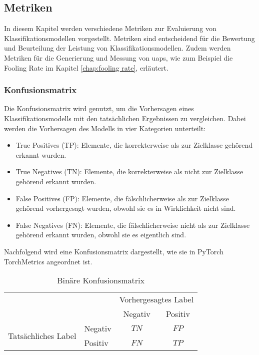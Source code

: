 \subsection{Metriken} \label{chap:metriken}
In diesem Kapitel werden verschiedene Metriken zur Evaluierung von Klassifikationsmodellen vorgestellt. Metriken sind entscheidend für die Bewertung und Beurteilung der Leistung von Klassifikationsmodellen. Zudem werden Metriken für die Generierung und Messung von \acrlong{uap}s, wie zum Beispiel die Fooling Rate im Kapitel \ref{chap:fooling rate}, erläutert. 

\subsubsection{Konfusionsmatrix} \label{chap:konfusionmatrix} 
Die Konfusionsmatrix wird genutzt, um die Vorhersagen eines Klassifikationsmodells mit den tatsächlichen Ergebnissen zu vergleichen. Dabei werden die Vorhersagen des Modells in vier Kategorien unterteilt:

\begin{itemize} 
    \item True Positives (TP): Elemente, die korrekterweise als zur Zielklasse gehörend  erkannt wurden.
    \item True Negatives (TN): Elemente, die korrekterweise als nicht zur Zielklasse gehörend erkannt wurden.
    \item False Positives (FP): Elemente, die fälschlicherweise als zur Zielklasse gehörend vorhergesagt wurden, obwohl sie es in Wirklichkeit nicht sind.
    \item False Negatives (FN): Elemente, die fälschlicherweise nicht als zur Zielklasse gehörend erkannt wurden, obwohl sie es eigentlich sind. 
\end{itemize}

Nachfolgend wird eine Konfusionsmatrix dargestellt, wie sie in PyTorch TorchMetrics angeordnet ist.

\begin{table}[H]
    \centering
    \begin{tabular}{l|l|c|c|}
        \multicolumn{2}{c}{}&\multicolumn{2}{c}{Vorhergesagtes Label}\\
        \cline{3-4}
        \multicolumn{2}{c|}{}&Negativ&Positiv\\
        \cline{2-4}
        \multirow{2}{*}{Tatsächliches Label}& Negativ & $TN$ & $FP$\\
        \cline{2-4}
        & Positiv & $FN$ & $TP$\\
        \cline{2-4}
    \end{tabular}
    \label{tab:conftable}
    \caption{Binäre Konfusionsmatrix}
\end{table}

